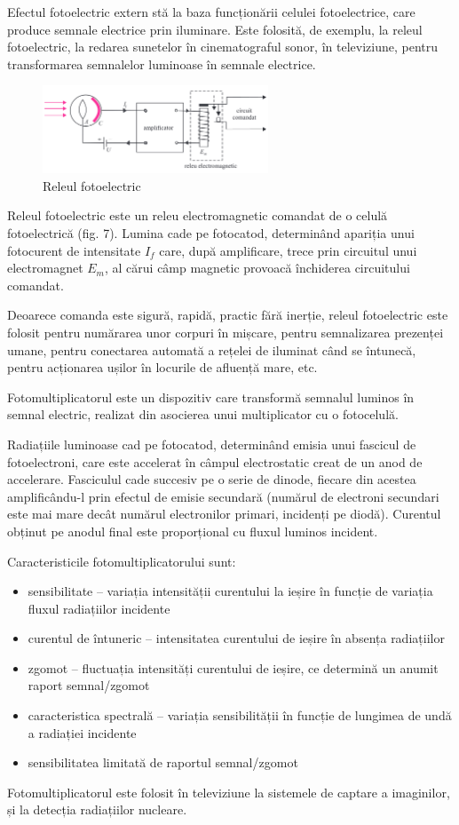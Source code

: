 Efectul fotoelectric extern stă la baza funcționării celulei fotoelectrice,
care produce semnale electrice prin iluminare. Este folosită, de exemplu, la
releul fotoelectric, la redarea sunetelor în cinematograful sonor, în
televiziune, pentru transformarea semnalelor luminoase în semnale electrice.

\begin{figure}
    \includegraphics[width=0.6\textwidth]{fig/releu_fotoelectric}
    \caption{Releul fotoelectric}
\end{figure}

Releul fotoelectric este un releu electromagnetic comandat de o celulă
fotoelectrică (fig. 7). Lumina cade pe fotocatod, determinând apariția unui
fotocurent de intensitate $I_f$ care, după amplificare, trece prin circuitul
unui electromagnet $E_m$, al cărui câmp magnetic provoacă închiderea circuitului
comandat.

Deoarece comanda este sigură, rapidă, practic fără inerție, releul fotoelectric
este folosit pentru numărarea unor corpuri în mișcare, pentru semnalizarea
prezenței umane, pentru conectarea automată a rețelei de iluminat când se
întunecă, pentru acționarea ușilor în locurile de afluență mare, etc.

\parbreak

Fotomultiplicatorul este un dispozitiv care transformă semnalul luminos
în semnal electric, realizat din asocierea unui multiplicator cu o
fotocelulă.

Radiațiile luminoase cad pe fotocatod, determinând emisia unui fascicul de
fotoelectroni, care este accelerat în câmpul electrostatic creat de un anod de
accelerare. Fasciculul cade succesiv pe o serie de dinode, fiecare din acestea
amplificându-l prin efectul de emisie secundară (numărul de electroni secundari
este mai mare decât numărul electronilor primari, incidenți pe diodă). Curentul
obținut pe anodul final este proporțional cu fluxul luminos incident.

Caracteristicile fotomultiplicatorului sunt:
\begin{itemize}
    \item sensibilitate -- variația intensității curentului la ieșire în
        funcție de variația fluxul radiațiilor incidente
    \item curentul de întuneric -- intensitatea curentului de ieșire în
        absența radiațiilor
    \item zgomot -- fluctuația intensități curentului de ieșire, ce determină
        un anumit raport semnal/zgomot
    \item caracteristica spectrală -- variația sensibilității în funcție
        de lungimea de undă a radiației incidente
    \item sensibilitatea limitată de raportul semnal/zgomot
\end{itemize}

Fotomultiplicatorul este folosit în televiziune la sistemele de captare a
imaginilor, și la detecția radiațiilor nucleare.
